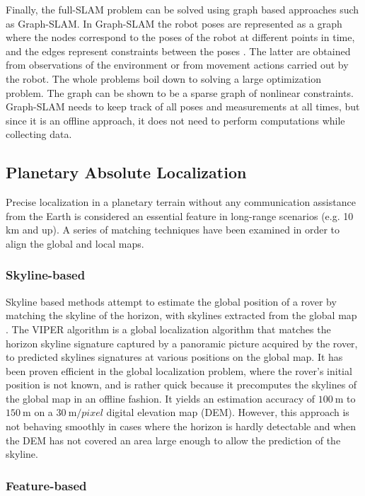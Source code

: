 Finally, the full-SLAM problem can be solved using graph based approaches
such as Graph-SLAM.
In Graph-SLAM the robot poses are represented as a graph where the
nodes correspond to the poses of the robot at different points in time,
and the edges represent constraints between the poses \parencite{Thrun2005}.
The latter are obtained from observations of the environment or from
movement actions carried out by the robot.
The whole problems boil down to solving a large optimization problem.
The graph can be shown to be a sparse graph of nonlinear constraints.
Graph-SLAM needs to keep track of all poses and measurements at all times,
but since it is an offline approach, it does not need to perform computations
while collecting data.

\subsection{Planetary Absolute Localization}

Precise localization in a planetary terrain without any communication
assistance from the Earth is considered an essential feature in
long-range scenarios (e.g. 10 km and up).
A series of matching techniques have been examined in order to align the
global and local maps.

\subsubsection{Skyline-based}

Skyline based methods attempt to estimate the global position of a rover
by matching the skyline of the horizon, with skylines extracted from
the global map \parencite{Stein1992, Cozman1997}.
The VIPER algorithm \parencite{Cozman2000} is a global localization
algorithm that matches the horizon skyline signature captured by a
panoramic picture acquired by the rover, to predicted skylines signatures
at various positions on the global map.
It has been proven efficient in the global localization problem,
where the rover's initial position is not known, and is rather quick because
it precomputes the skylines of the global map in an offline fashion.
It yields an estimation accuracy of $\SI{100}{\m}$ to $\SI{150}{\m}$ on a
$\SI{30}{\m \per pixel}$ digital elevation map (DEM).
However, this approach is not behaving smoothly in cases where the horizon
is hardly detectable and when the DEM has not covered an area large enough
to allow the prediction of the skyline.

\subsubsection{Feature-based}

